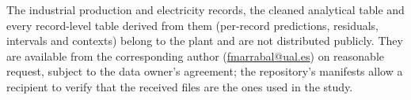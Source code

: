\documentclass[11pt,a4paper]{article}
\begin{document}
The industrial production and electricity records, the cleaned analytical table and every record-level table derived from them (per-record predictions, residuals, intervals and contexts) belong to the plant and are not distributed publicly. They are available from the corresponding author (\href{mailto:fmarrabal@ual.es}{fmarrabal@ual.es}) on reasonable request, subject to the data owner's agreement; the repository's manifests allow a recipient to verify that the received files are the ones used in the study.
\end{document}
